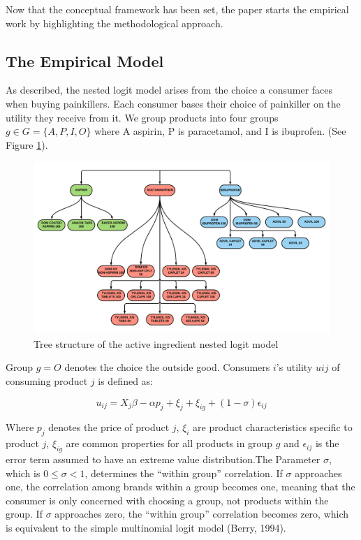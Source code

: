\documentclass[12pt, authoryear]{elsarticle}
\begin{document}
Now that the conceptual framework has been set, the paper starts the empirical work by highlighting the methodological approach.

\subsection{The Empirical Model} 
As described, the nested logit model arises from the choice a consumer faces when buying painkillers. Each consumer bases their choice of painkiller on the utility they receive from it. We group products into four groups $g \in G = \{ A, P, I, O \}$ where A aspirin, P is paracetamol, and I is ibuprofen.  (See Figure \ref{tree1}). 


\begin{figure}[H]
	\centering
	\includegraphics[clip, angle=0, width=1\textwidth]{FIG1.pdf}
	\caption{Tree structure of the active ingredient nested logit model}\label{tree1}
\end{figure}



Group $g = O$ denotes the choice the outside good. Consumers $i$'s utility $u{ij}$ of consuming product $j$ is defined as: 

\begin{equation}
u_{ij} = X_j \beta - \alpha p_j + \xi _{j} + \xi _ {ig} + (1- \sigma)\epsilon_{ij}
\end{equation} 

Where $p_j$ denotes the price of product $j$, $\xi_{i}$ are product characteristics specific to product $j$, $\xi_{ig}$ are common properties for all products in group $g$ and $\epsilon_{ij}$ is the error term assumed to have an extreme value distribution.The Parameter $\sigma$, which
is $0 \leq \sigma < 1$, determines the ``within group'' correlation. If $\sigma$ approaches one, the correlation
among brands within a group becomes one, meaning that the consumer is only concerned with choosing a group, not products within the group. If $\sigma$ approaches zero, the ``within group'' correlation becomes zero, which is equivalent to the simple multinomial logit model (Berry, 1994). 
\end{document}
